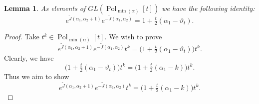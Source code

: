 \documentclass[10pt,a4paper]{amsart}
\newtheorem{lemma}{Lemma}
\DeclareMathOperator{\Pol}{Pol}
\begin{document}
\begin{lemma}\label{lem:eDD}
As elements of $GL(\Pol_{\min(\alpha)}[t])$ we have the following identity:
\begin{equation*}
e^{\tilde{J}(\alpha_1,\alpha_2+1)}e^{-\tilde{J}(\alpha_1,\alpha_2)}=1+\tfrac{t}{2}(\alpha_1-\vartheta_t).
\end{equation*}
\end{lemma}

\begin{proof}
Take $t^k \in \Pol_{\min(\alpha)}[t]$. We wish to prove
\begin{equation*}
e^{\tilde{J}(\alpha_1,\alpha_2+1)}e^{-\tilde{J}(\alpha_1,\alpha_2)}t^k
=\big(1+\tfrac{t}{2}(\alpha_1-\vartheta_t)\big)t^k.
\end{equation*}
Clearly, we have 
\begin{equation*}
\big(1+\tfrac{t}{2}(\alpha_1-\vartheta_t)\big)t^k 
= \big(1+\tfrac{t}{2}(\alpha_1- k)\big)t^k.
\end{equation*}
Thus we aim to show
\begin{equation*}
e^{\tilde{J}(\alpha_1,\alpha_2+1)}e^{-\tilde{J}(\alpha_1,\alpha_2)}t^k
= \big(1+\tfrac{t}{2}(\alpha_1- k)\big)t^k.
\end{equation*}


\end{proof}
\end{document}

